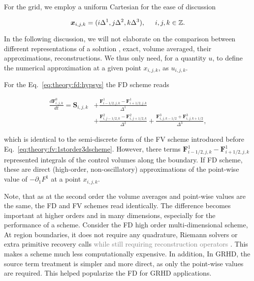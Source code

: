 For the grid, we employ a uniform Cartesian for the ease of discussion 

\begin{equation}
\boldsymbol{x}_{i,j,k} = (i\Delta^1, j\Delta^2, k\Delta^3), \hspace{5mm} i,j,k\in \mathbb{Z}.
\end{equation}

In the following discussion, we will not elaborate on the comparison between different representations of a solution \ie, exact, volume averaged, their approximations, reconstructions. We thus only need, for a quantity $u$, to define the numerical approximation at a given point $x_{i,j,k}$, as $u_{i,j,k}$. 

For the Eq.~\eqref{eq:theory:fd:hypsys} the \ac{FD} scheme reads

\begin{align}
\frac{d\boldsymbol{F}^{0}_{i,j,k}}{dt} = \boldsymbol{S}_{i,j,k} &+ \frac{\boldsymbol{F}^{1}_{i-1/2,j,k} - \boldsymbol{F}^{1}_{i+1/2,j,k}}{\Delta^1} \\
& + \frac{\boldsymbol{F}^{2}_{i,j-1/2,k} - \boldsymbol{F}^{2}_{i,j+1/2,k}}{\Delta^2} + \frac{\boldsymbol{F}^{3}_{i,j,k-1/2} + \boldsymbol{F}^{3}_{i,j,k+1/2}}{\Delta^3},
\end{align}

which is identical to the semi-discrete form of the \ac{FV} scheme introduced before Eq.~\eqref{eq:theory:fv:1storder3dscheme}. However, there terms $\boldsymbol{F}^{1}_{i-1/2,j,k} - \boldsymbol{F}^{1}_{i+1/2,j,k}$ represented integrals of the control volumes along the boundary. If \ac{FD} scheme, these are direct (high-order, non-oscillatory) approximations of the point-wise value of $-\partial_1 F^1$ at a point $x_{i,j,k}$. 

Note, that as at the second order the volume averages and point-wise values are the same, the \ac{FD} and \ac{FV} schemes read identically. The difference becomes important at higher orders and in many dimensions, especially for the performance of a scheme. 
%
Consider the \ac{FD} high order multi-dimensional scheme, At region boundaries, it does not require any quadrature, Riemann solvers or extra primitive recovery calls \textcolor{gray}{
    while still requiring reconstruction operators
}. 
This makes a scheme much less computationally expensive. In addition, In \ac{GRHD}, the source term treatment is simpler and more direct, as only the point-wise values are required. This helped popularize the \ac{FD} for \ac{GRHD} applications. 

